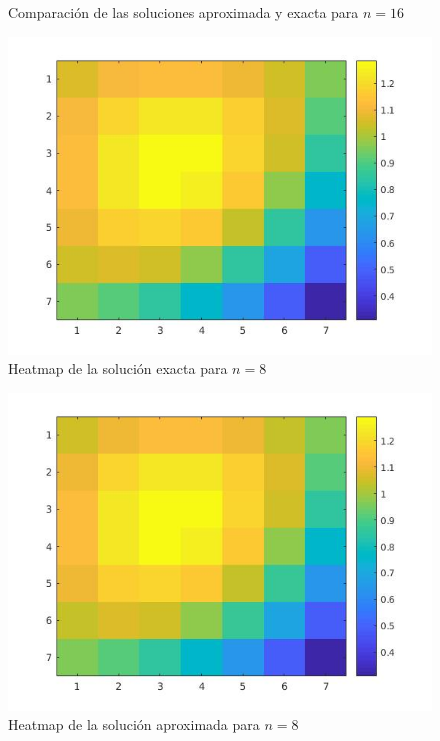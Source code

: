 \begin{itemize}
\begin{figure}[H]
	\caption{Comparación de las soluciones aproximada y exacta para $n=16$}
	\label{fig:img_pecc}
\end{figure}
%
\begin{figure}[H]
	\centering
	\includegraphics[scale=0.35]{images/img_prob_6_colormap_n8_exact.jpg}
	\caption{Heatmap de la solución exacta para $n=8$}
	\label{fig:img_pecc}
\end{figure}
%
\begin{figure}[H]
	\centering
	\includegraphics[scale=0.35]{images/img_prob_6_colormap_n8_approx.jpg}
	\caption{Heatmap de la solución aproximada para $n=8$}
	\label{fig:img_pecc}
\end{figure}

\end{itemize}
